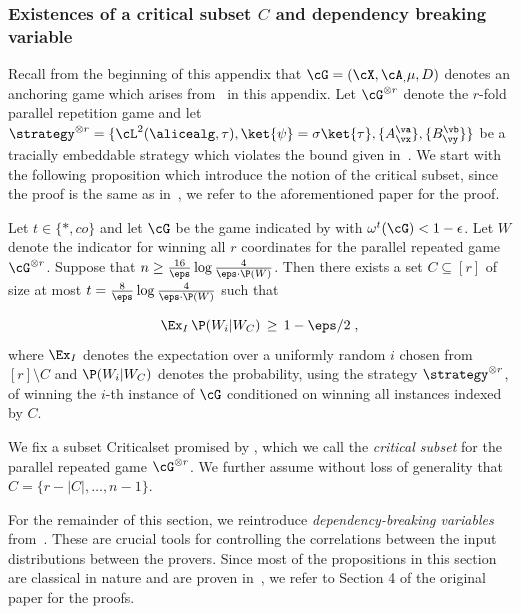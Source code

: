 \subsubsection{Existences of a critical subset $C$ and dependency breaking variable} 
\label{sec:p_setup}
Recall from the beginning of this appendix that $\cG = (\cX, \cA_, \mu, D)$ denotes an anchoring game which arises from~ in this appendix. Let $\cG^{\otimes r}$ denote the $r$-fold parallel repetition game and let $\strategy^{\otimes r} = \{ \cL^2(\alicealg, \tau), \ket{\psi} = \sigma \ket{\tau}, \{A_
\vx^\va \}, \{B_\vy^\vb \} \}$ be a tracially embeddable strategy which violates the bound given in~. We start with the following proposition which introduce the notion of the critical subset, since the proof is the same as in~\cite{bavarianAnchoredParallelRepetition2021}, we refer to the aforementioned paper for the proof. 

\begin{proposition} \label{prop:existcriticalset}
	\label{prop:subset}
	Let $t \in \{*, co\}$ and let $\cG$ be the game indicated by  with $\omega^{t}(\cG) < 1- \epsilon$.	Let $W$ denote the indicator for winning all $r$ coordinates for the parallel repeated game $\cG^{\otimes r}$. Suppose that $n \geq \frac{16}{\eps} \log \frac{4}{\eps \cdot \P(W)}$. Then there exists a set $C \subseteq [r]$ of size at most $t = \frac{8}{\eps} \log \frac{4}{\eps \cdot \P(W)}$ such that
	
	$$
	\Ex_I\, \P (W_i | W_C) \,\geq \, 1 - \eps/2\;,
	$$
	where $\Ex_I$ denotes the expectation over a uniformly random $i$ chosen from $[r] \setminus C$ and $\P(W_i | W_C)$ denotes the probability, using the strategy $\strategy^{\otimes r}$, of winning the $i$-th instance of $\cG$ conditioned on winning all instances indexed by $C$.
\end{proposition}

We fix a subset \gls{Criticalset} promised by , which we call the \textit{critical subset} for the parallel repeated game $\cG^{\otimes r}$. We further assume without loss of generality that $C = \{r-|C|,\ldots,n-1\}$. 

For the remainder of this section, we reintroduce \emph{dependency-breaking variables} from~\cite{bavarianAnchoredParallelRepetition2021}. These are crucial tools for controlling the correlations between the input distributions between the provers. Since most of the propositions in this section are classical in nature and are proven in~\cite{bavarianAnchoredParallelRepetition2021}, we refer to Section 4 of the original paper for the proofs. 


